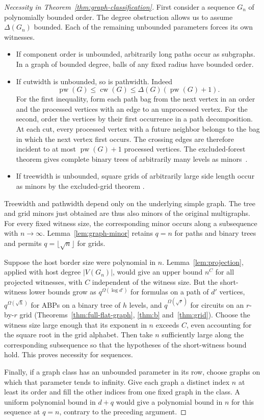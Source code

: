 \begin{proof}[Necessity in Theorem~\ref{thm:graph-classification}]
First consider a sequence \(G_n\) of polynomially bounded order.
The degree obstruction allows us to assume \(\Delta(G_n)\) bounded.
Each of the remaining unbounded parameters forces its own witnesses.

\begin{itemize}
\item If component order is unbounded, arbitrarily long paths occur
as subgraphs. In a graph of bounded degree, balls of any fixed radius
have bounded order.
\item If cutwidth is unbounded, so is pathwidth. Indeed
\[
 \operatorname{pw}(G)\le\operatorname{cw}(G)
 \le\Delta(G)(\operatorname{pw}(G)+1).
\]
For the first inequality, form each path bag from the next vertex in
an order and the processed vertices with an edge to an unprocessed
vertex. For the second, order the vertices by their first occurrence
in a path decomposition. At each cut, every processed vertex with a
future neighbor belongs to the bag in which the next vertex first
occurs. The crossing edges are therefore incident to at most
\(\operatorname{pw}(G)+1\) processed vertices. The excluded-forest
theorem gives complete binary trees of arbitrarily many levels as
minors~\cite{BRST}.
\item If treewidth is unbounded, square grids of arbitrarily large side
length occur as minors by the excluded-grid theorem
\cite{RSgrid,ChekuriChuzhoy}.
\end{itemize}

Treewidth and pathwidth depend only on the underlying simple graph.
The tree and grid minors just obtained are thus also minors of the
original multigraphs. For every fixed witness size, the corresponding
minor occurs along a subsequence with \(n\to\infty\).
Lemma~\ref{lem:graph-minor} retains \(q=n\) for paths and binary trees
and permits \(q=\lfloor\sqrt n\rfloor\) for grids.

Suppose the host border size were polynomial in \(n\).
Lemma~\ref{lem:projection}, applied with host degree \(|V(G_n)|\),
would give an upper bound \(n^C\) for all projected witnesses, with
\(C\) independent of the witness size. But the short-witness lower
bounds grow as \(q^{\Omega(\log d')}\) for formulas on a path of
\(d'\) vertices, \(q^{\Omega(\sqrt h)}\) for ABPs on a binary tree of
\(h\) levels, and \(q^{\Omega(\sqrt r)}\) for circuits on an
\(r\)-by-\(r\) grid (Theorems~\ref{thm:full-flat-graph},
\ref{thm:b} and~\ref{thm:grid}). Choose the witness size large enough
that its exponent in \(n\) exceeds \(C\), even accounting for the
square root in the grid alphabet. Then take \(n\) sufficiently large
along the corresponding subsequence so that the hypotheses of the
short-witness bound hold. This proves necessity for sequences.

Finally, if a graph class has an unbounded parameter in its row, choose
graphs on which that parameter tends to infinity. Give each graph a
distinct index \(n\) at least its order and fill the other indices from
one fixed graph in the class. A uniform polynomial bound in \(d+q\)
would give a polynomial bound in \(n\) for this sequence at \(q=n\),
contrary to the preceding argument.
\end{proof}
